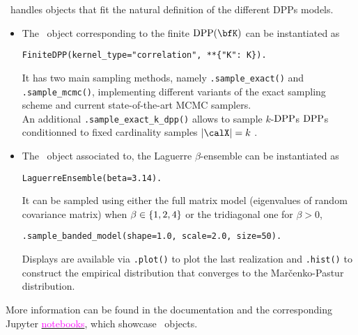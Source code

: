 \documentclass[twoside,11pt]{article}
\begin{document}
    \DPPy\ handles objects that fit the natural definition of the different DPPs models.
    \begin{itemize}
        \item The \DPPy\ object corresponding to the finite $\DPP(\bfK)$ can be instantiated as
        \begin{lstlisting}[aboveskip=5pt,
                      belowskip=-1pt,
                      xleftmargin=.1\textwidth,
                      xrightmargin=.2\textwidth]
        FiniteDPP(kernel_type="correlation", **{"K": K}).
        \end{lstlisting}
        It has two main sampling methods, namely
        \lstinline{.sample_exact()} and
        \lstinline{.sample_mcmc()},
        implementing different variants of the exact sampling scheme and current state-of-the-art MCMC samplers.\\
        An additional
        \lstinline{.sample_exact_k_dpp()}
        allows to sample $k$-$\operatorname{DPP}$s \ie $\operatorname{DPP}$s conditionned to fixed cardinality samples $|\calX|=k$ \citep[Section 5]{KuTa12}.

        \item The \DPPy\ object associated to, \eg the Laguerre $\beta$-ensemble can be instantiated as
        \begin{lstlisting}[aboveskip=5pt,
                          belowskip=-1pt,
                          xleftmargin=.2\textwidth,
                          xrightmargin=.2\textwidth]
          LaguerreEnsemble(beta=3.14).
        \end{lstlisting}
        It can be sampled using either the full matrix model (eigenvalues of random covariance matrix) when $\beta\in\left\{ 1,2,4 \right\}$ or the tridiagonal one for $\beta > 0$,
          \begin{lstlisting}[aboveskip=5pt,
                          belowskip=-1pt,
                          xleftmargin=.1\textwidth,
                          xrightmargin=.2\textwidth]
          .sample_banded_model(shape=1.0, scale=2.0, size=50).
          \end{lstlisting}
        Displays are available via
        \lstinline{.plot()} to plot the last realization and
        \lstinline{.hist()} to construct the empirical distribution that converges to the Mar\v{c}enko-Pastur distribution.
    \end{itemize}
    More information can be found in the documentation and the corresponding Jupyter \href{https://github.com/guilgautier/DPPy/tree/master/notebooks}{\textcolor{magenta}{notebooks}}, which showcase \DPPy\ objects.
\end{document}
